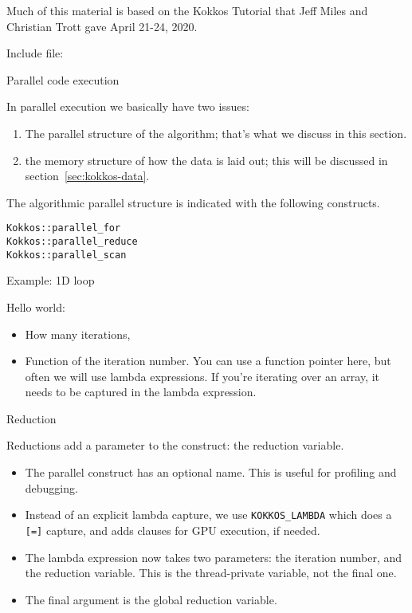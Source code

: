 
Much of this material is based on the 
Kokkos Tutorial
that 
Jeff Miles and Christian Trott
gave
April 21-24, 2020.

Include file:

 {Parallel code execution}

In parallel execution we basically have two issues:
\begin{enumerate}
\item The parallel structure of the algorithm;
  that's what we discuss in this section.
\item the memory structure of how the data is laid out;
  this will be discussed in section~\ref{sec:kokkos-data}.
\end{enumerate}

The algorithmic parallel structure is indicated with the following constructs.
\begin{lstlisting}
Kokkos::parallel_for
Kokkos::parallel_reduce
Kokkos::parallel_scan
\end{lstlisting}

 {Example: 1D loop}

Hello world:

\begin{itemize}
\item How many iterations,
\item Function of the iteration number.
  You can use a function pointer here, but often we will use lambda expressions.
  If you're iterating over an array, it needs to be captured in the lambda expression.
\end{itemize}

 {Reduction}

Reductions add a parameter to the construct: the reduction variable.

\begin{itemize}
\item The parallel construct has an optional name.
  This is useful for profiling and debugging.
\item Instead of an explicit lambda capture, we use
  \lstinline+KOKKOS_LAMBDA+ which does a \lstinline+[=]+ capture,
  and adds clauses for \ac{GPU} execution, if needed.
\item The lambda expression now takes two parameters: the iteration number,
  and the reduction variable. This is the thread-private variable, not the final one.
\item The final argument is the global reduction variable.
\end{itemize}

